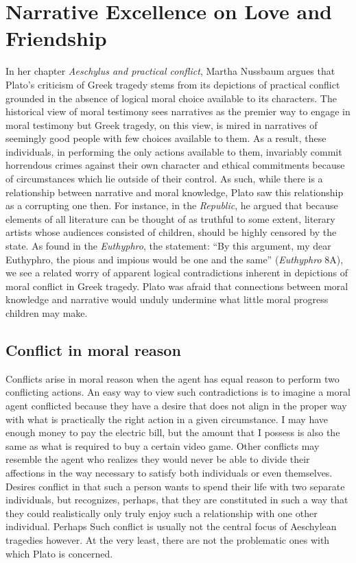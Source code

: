 \documentclass[phdthesis,12pt,final]{wuthesis}
\theoremstyle{definition}
\theoremstyle{definition}
\theoremstyle{definition}
\theoremstyle{definition}
\theoremstyle{remark}
\begin{document}
\section{Narrative Excellence on Love and Friendship}\label{narrative-excellence-on-love-and-friendship}

In her chapter \emph{Aeschylus and practical conflict}, Martha Nussbaum argues that Plato's criticism of Greek tragedy stems from its depictions of practical conflict grounded in the absence of logical moral choice available to its characters. The historical view of moral testimony sees narratives as the premier way to engage in moral testimony but Greek tragedy, on this view, is mired in narratives of seemingly good people with few choices available to them. As a result, these individuals, in performing the only actions available to them, invariably commit horrendous crimes against their own character and ethical commitments because of circumstances which lie outside of their control. As such, while there is a relationship between narrative and moral knowledge, Plato saw this relationship as a corrupting one then. For instance, in the \emph{Republic}, he argued that because elements of all literature can be thought of as truthful to some extent, literary artists whose audiences consisted of children, should be highly censored by the state. As found in the \emph{Euthyphro}, the statement: ``By this argument, my dear Euthyphro, the pious and impious would be one and the same'' (\emph{Euthyphro} 8A), we see a related worry of apparent logical contradictions inherent in depictions of moral conflict in Greek tragedy. Plato was afraid that connections between moral knowledge and narrative would unduly undermine what little moral progress children may make.

\subsection*{Conflict in moral reason}\label{conflict-in-moral-reason}

Conflicts arise in moral reason when the agent has equal reason to perform two conflicting actions. An easy way to view such contradictions is to imagine a moral agent conflicted because they have a desire that does not align in the proper way with what is practically the right action in a given circumstance. I may have enough money to pay the electric bill, but the amount that I possess is also the same as what is required to buy a certain video game. Other conflicts may resemble the agent who realizes they would never be able to divide their affections in the way necessary to satisfy both individuals or even themselves. Desires conflict in that such a person wants to spend their life with two separate individuals, but recognizes, perhaps, that they are constituted in such a way that they could realistically only truly enjoy such a relationship with one other individual. Perhaps Such conflict is usually not the central focus of Aeschylean tragedies however. At the very least, there are not the problematic ones with which Plato is concerned.
\end{document}

